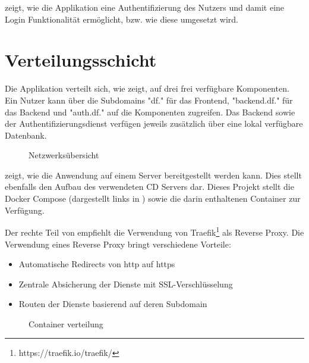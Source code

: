  zeigt, wie die Applikation eine Authentifizierung des Nutzers und damit 
eine Login Funktionalität ermöglicht, bzw. wie diese umgesetzt wird.

\section{Verteilungsschicht}\label{sec:verteilungsschicht}
Die Applikation verteilt sich, wie  zeigt, auf drei frei verfügbare Komponenten.
Ein Nutzer kann über die Subdomains "df." für das Frontend, "backend.df." für das Backend und "auth.df."
auf die Komponenten zugreifen.
Das Backend sowie der Authentifizierungsdienst verfügen jeweils zusätzlich über eine lokal verfügbare Datenbank.

\begin{figure}[h]
    \centering
    
    \caption{Netzwerksübersicht}\label{fig:Netzwerksuebersicht}
\end{figure}

\newpage
{} zeigt, wie die Anwendung auf einem Server bereitgestellt werden kann.
Dies stellt ebenfalls den Aufbau des verwendeten \ac{CD} Servers dar.
Dieses Projekt stellt die Docker Compose (dargestellt links in )
sowie die darin enthaltenen Container zur Verfügung.

Der rechte Teil von  empfiehlt die Verwendung von Traefik\footnote{https://traefik.io/traefik/}
als Reverse Proxy.
Die Verwendung eines Reverse Proxy bringt verschiedene Vorteile:
\begin{itemize}
    \item Automatische Redirects von http auf https
    \item Zentrale Absicherung der Dienste mit \ac{SSL}-Verschlüsselung
    \item Routen der Dienste basierend auf deren Subdomain
\end{itemize}

\begin{figure}[h]
    \centering
    
    \caption{Container verteilung}\label{fig:Container-verteilung}
\end{figure}